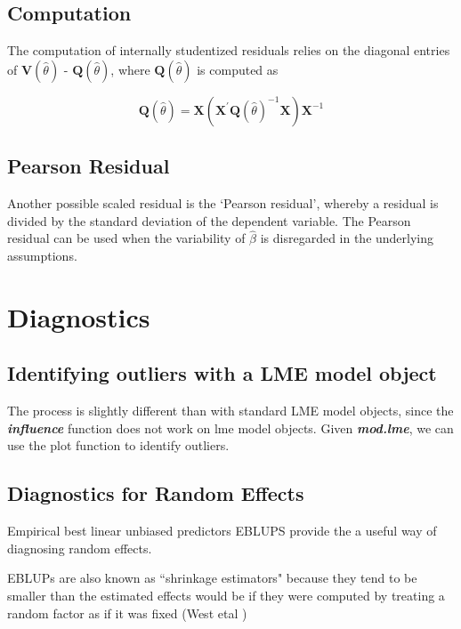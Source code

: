 \documentclass[Main.tex]{subfiles}
\begin{document}
\subsection{Computation}%

The computation of internally studentized residuals relies on the diagonal entries of $\boldsymbol{V} (\hat{\theta})$ - $\boldsymbol{Q} (\hat{\theta})$, where $\boldsymbol{Q} (\hat{\theta})$ is computed as

\[ \boldsymbol{Q} (\hat{\theta}) = \boldsymbol{X} ( \boldsymbol{X}^{\prime}\boldsymbol{Q} (\hat{\theta})^{-1}\boldsymbol{X})\boldsymbol{X}^{-1} \]

\subsection{Pearson Residual}%

Another possible scaled residual is the  `Pearson residual', whereby a residual is divided by the standard deviation of the dependent variable. The Pearson residual can be used when the variability of $\hat{\beta}$ is disregarded in the underlying assumptions.


\newpage
\section{Diagnostics}

\subsection{Identifying outliers with a LME model object}

The process is slightly different than with standard LME model objects, since the \textbf{\emph{influence}}
function does not work on lme model objects. Given \textbf{\emph{mod.lme}}, we can use the plot function to
identify outliers.
\subsection{Diagnostics for Random Effects}
Empirical best linear unbiased predictors EBLUPS provide the a useful way of diagnosing random effects.

EBLUPs are also known as ``shrinkage estimators" because they tend to be smaller than the estimated effects would be if they were computed by treating a random factor as if it was fixed (West etal )
\end{document}
